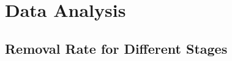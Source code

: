 \documentclass{article}
\begin{document}





\section{Data Analysis}


\subsection{Removal Rate for Different Stages}
\end{document}
